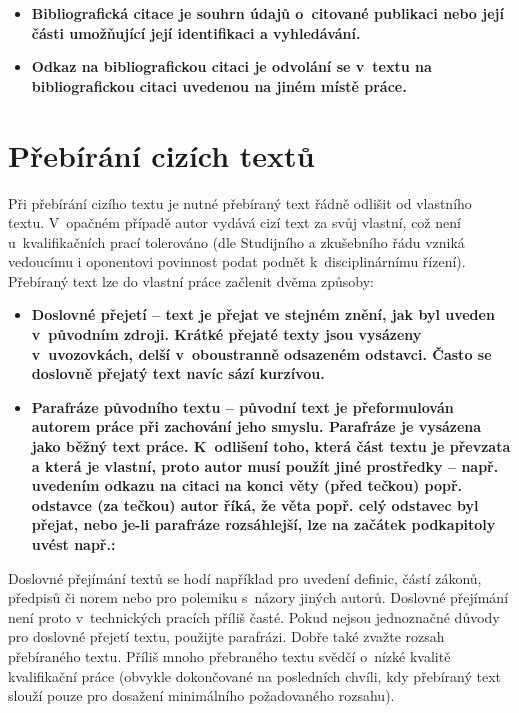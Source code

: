 \begin{itemize}
  \item{\bf Bibliografická citace \rm je souhrn údajů o~citované publikaci nebo její části umožňující její identifikaci a vyhledávání.}
  \item{\bf Odkaz na bibliografickou citaci \rm je odvolání se v~textu na bibliografickou citaci uvedenou na jiném místě práce.}
\end{itemize}

\section{Přebírání cizích textů}

Při přebírání cizího textu je nutné přebíraný text řádně odlišit od vlastního textu. V~opačném případě autor vydává cizí text za svůj vlastní, což není u~kvalifikačních prací tolerováno (dle Studijního a zkušebního řádu vzniká vedoucímu i oponentovi povinnost podat podnět k~disciplinárnímu řízení). 
Přebíraný text lze do vlastní práce začlenit dvěma způsoby:

\begin{itemize}
  \item{\bf Doslovné přejetí \rm -- text je přejat ve stejném znění, jak byl uveden v~původním zdroji. Krátké přejaté texty jsou vysázeny v~uvozovkách, delší v~oboustranně odsazeném odstavci. Často se doslovně přejatý text navíc sází kurzívou.}
  \item{\bf Parafráze původního textu \rm -- původní text je přeformulován autorem práce při zachování jeho smyslu. Parafráze je vysázena jako běžný text práce. K~odlišení toho, která část textu je převzata a která je vlastní, proto autor musí použít jiné prostředky -- např. uvedením odkazu na citaci na konci věty (před tečkou) popř. odstavce (za tečkou) autor říká, že věta popř. celý odstavec byl přejat, nebo je-li parafráze rozsáhlejší, lze na začátek podkapitoly uvést např.: } 
\end{itemize}
    
Doslovné přejímání textů se hodí například pro uvedení definic, částí zákonů, předpisů či norem nebo pro polemiku s~názory jiných autorů. Doslovné přejímání není proto v~technických pracích příliš časté. Pokud nejsou jednoznačné důvody pro doslovné přejetí textu, použijte parafrázi. Dobře také zvažte rozsah přebíraného textu. Příliš mnoho přebraného textu svědčí o~nízké kvalitě kvalifikační práce (obvykle dokončované na posledních chvíli, kdy přebíraný text slouží pouze pro dosažení minimálního požadovaného rozsahu).


